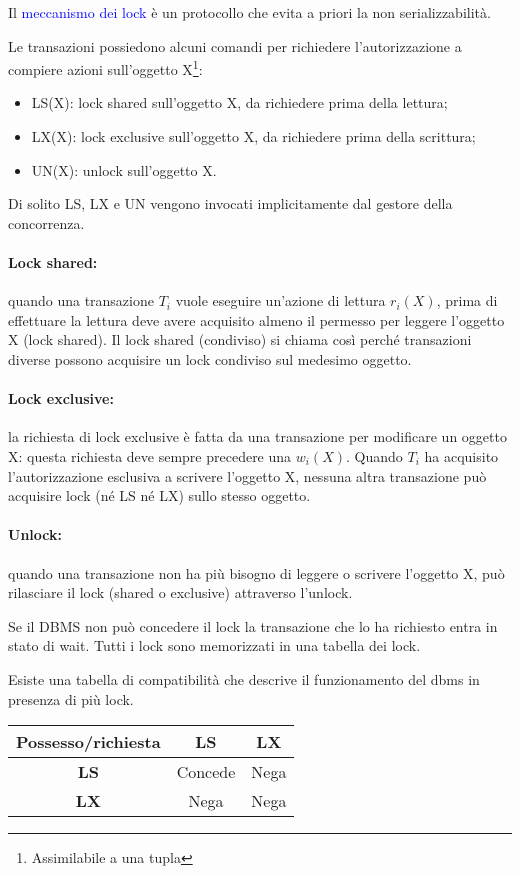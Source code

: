 Il \textcolor{blue}{meccanismo dei lock} è un protocollo che evita a priori la non serializzabilità.

Le transazioni possiedono alcuni comandi per richiedere l’autorizzazione a compiere azioni sull’oggetto X\footnote{Assimilabile a una tupla}:

\begin{itemize}
    \item LS(X): lock shared sull'oggetto X, da richiedere prima della lettura;
    \item LX(X): lock exclusive sull'oggetto X, da richiedere prima della scrittura;
    \item UN(X): unlock sull'oggetto X.
\end{itemize}

Di solito LS, LX e UN vengono invocati implicitamente dal gestore della concorrenza.

\paragraph{Lock shared:} quando una transazione $T_i$ vuole eseguire un’azione di lettura $r_i(X)$, prima di effettuare la lettura deve avere acquisito almeno il permesso per leggere l’oggetto X (lock shared). Il lock shared (condiviso) si chiama così perché transazioni diverse possono acquisire un lock condiviso sul medesimo oggetto.

\paragraph{Lock exclusive:} la richiesta di lock exclusive è fatta da una transazione per modificare un oggetto X: questa richiesta deve sempre precedere una $w_i(X)$. Quando $T_i$ ha acquisito l’autorizzazione esclusiva a scrivere l’oggetto X, nessuna altra transazione può acquisire lock (né LS né LX) sullo stesso oggetto.

\paragraph{Unlock:} quando una transazione non ha più bisogno di leggere o scrivere l’oggetto X, può rilasciare il lock
(shared o exclusive) attraverso l’unlock.

Se il DBMS non può concedere il lock la transazione che lo ha richiesto entra in stato di wait. Tutti i lock sono memorizzati in una tabella dei lock.

Esiste una tabella di compatibilità che descrive il funzionamento del dbms in presenza di più lock.
\begin{center}
    \begin{tabular}{|c|c|c|}
        \hline
        \textbf{Possesso/richiesta} & \textbf{LS} & \textbf{LX} \\
        \hline
        \textbf{LS} & Concede & Nega \\
        \hline
        \textbf{LX} & Nega & Nega \\
        \hline
    \end{tabular}
\end{center}


